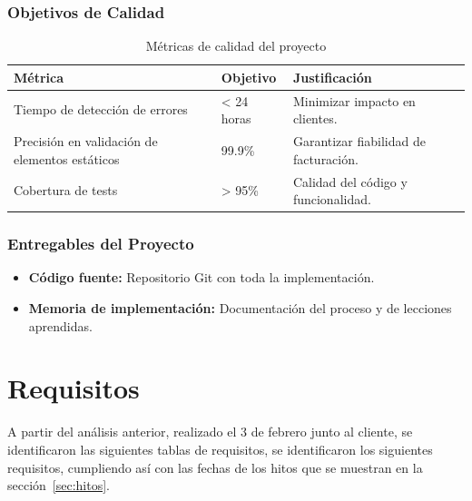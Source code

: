 \subsubsection{Objetivos de Calidad}

\begin{table}[htbp]
    \centering
    \begin{tabular}{|p{}|p{}|p{}|}
        \hline
        \textbf{Métrica}                               & \textbf{Objetivo} & \textbf{Justificación}                \\
        \hline
        \hline
        Tiempo de detección de errores                 & < 24 horas        & Minimizar impacto en clientes.        \\
        \hline
        Precisión en validación de elementos estáticos & 99.9\%            & Garantizar fiabilidad de facturación. \\
        \hline
        Cobertura de tests                             & > 95\%            & Calidad del código y funcionalidad.   \\
        \hline
    \end{tabular}
    \caption{Métricas de calidad del proyecto}
    \label{tab:metricas-calidad}
\end{table}

\subsubsection{Entregables del Proyecto}

\begin{itemize}
    \item \textbf{Código fuente:} Repositorio Git con toda la implementación.
    \item \textbf{Memoria de implementación:} Documentación del proceso y de lecciones aprendidas.
\end{itemize}

\section{Requisitos}
A partir del análisis anterior, realizado el 3 de febrero junto al cliente, se identificaron las siguientes tablas de requisitos, se identificaron los siguientes requisitos, cumpliendo así con las fechas de los hitos que se muestran en la sección~\ref{sec:hitos}.


